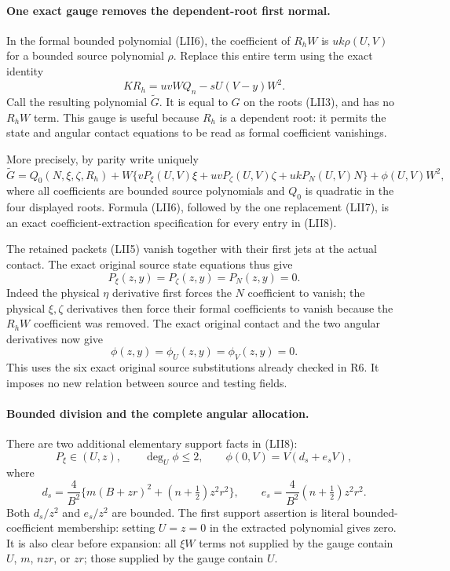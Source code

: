 \paragraph{One exact gauge removes the dependent-root first normal.}
In the formal bounded polynomial (LII6), the coefficient of $R_hW$
is $uk\rho(U,V)$ for a bounded source polynomial $\rho$.  Replace
this entire term using the exact identity
\[
 KR_h=uvWQ_n-sU(V-y)W^2.                         \tag{LII7}
\]
Call the resulting polynomial $\widetilde G$.  It is equal to $G$
on the roots (LII3), and has no $R_hW$ term.  This gauge is useful
because $R_h$ is a dependent root: it permits the state and angular
contact equations to be read as formal coefficient vanishings.

More precisely, by parity write uniquely
\[
 \widetilde G=Q_0(N,\xi,\zeta,R_h)
 +W\{vP_\xi(U,V)\xi+uvP_\zeta(U,V)\zeta
                         +ukP_N(U,V)N\}
 +\phi(U,V)W^2,                                  \tag{LII8}
\]
where all coefficients are bounded source polynomials and $Q_0$ is
quadratic in the four displayed roots.  Formula (LII6), followed by
the one replacement (LII7), is an exact coefficient-extraction
specification for every entry in (LII8).

The retained packets (LII5) vanish together with their first jets at
the actual contact.  The exact original source state equations thus
give
\[
 P_\xi(z,y)=P_\zeta(z,y)=P_N(z,y)=0.              \tag{LII9}
\]
Indeed the physical $\eta$ derivative first forces the $N$ coefficient
to vanish; the physical $\xi,\zeta$ derivatives then force their
formal coefficients to vanish because the $R_hW$ coefficient was
removed.  The exact original contact and the two angular derivatives
now give
\[
 \phi(z,y)=\phi_U(z,y)=\phi_V(z,y)=0.              \tag{LII10}
\]
This uses the six exact original source substitutions already checked
in R6.  It imposes no new relation between source and testing fields.

\paragraph{Bounded division and the complete angular allocation.}
There are two additional elementary support facts in (LII8):
\[
 P_\xi\in(U,z),\qquad \deg_U\phi\leq2,\qquad
 \phi(0,V)=V(d_s+e_sV),                           \tag{LII11}
\]
where
\[
 d_s=\frac4{B^2}\{m(B+zr)^2+(n+\tfrac12)z^2r^2\},\qquad
 e_s=\frac4{B^2}(n+\tfrac12)z^2r^2.
\]
Both $d_s/z^2$ and $e_s/z^2$ are bounded.  The first support assertion
is literal bounded-coefficient membership: setting $U=z=0$ in the
extracted polynomial gives zero.  It is also clear before expansion:
all $\xi W$ terms not supplied by the gauge contain $U$, $m$, $nzr$,
or $zr$; those supplied by the gauge contain $U$.

